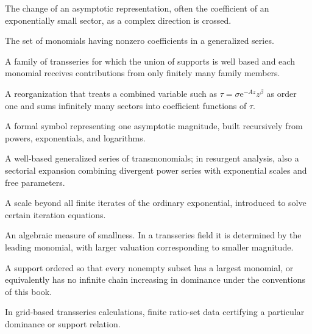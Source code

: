 \documentclass[11pt,oneside]{book}
\theoremstyle{definition}
\theoremstyle{remark}
\newcommand{\e}{\mathrm{e}}
\begin{document}
\begin{description}[style=nextline,leftmargin=2em]
\item[Stokes phenomenon]
The change of an asymptotic representation, often the coefficient of an
exponentially small sector, as a complex direction is crossed.

\item[Support]
The set of monomials having nonzero coefficients in a generalized series.

\item[Summable family]
A family of transseries for which the union of supports is well based and each
monomial receives contributions from only finitely many family members.

\item[Transasymptotic rearrangement]
A reorganization that treats a combined variable such as
$\tau=\sigma\e^{-Az}z^\beta$ as order one and sums infinitely many sectors into
coefficient functions of $\tau$.

\item[Transmonomial]
A formal symbol representing one asymptotic magnitude, built recursively from
powers, exponentials, and logarithms.

\item[Transseries]
A well-based generalized series of transmonomials; in resurgent analysis, also a
sectorial expansion combining divergent power series with exponential scales and
free parameters.

\item[Transexponential]
A scale beyond all finite iterates of the ordinary exponential, introduced to
solve certain iteration equations.

\item[Valuation]
An algebraic measure of smallness. In a transseries field it is determined by the
leading monomial, with larger valuation corresponding to smaller magnitude.

\item[Well-based support]
A support ordered so that every nonempty subset has a largest monomial, or
equivalently has no infinite chain increasing in dominance under the conventions
of this book.

\item[Witness]
In grid-based transseries calculations, finite ratio-set data certifying a
particular dominance or support relation.
\end{description}


\backmatter
{}
{}
\end{document}
